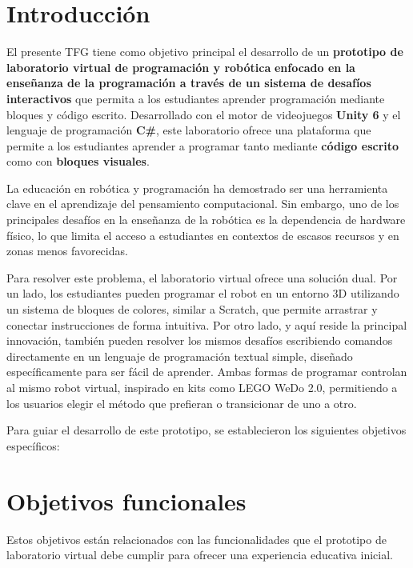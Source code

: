 
\section{Introducción}

El presente TFG tiene como objetivo principal el desarrollo de un \textbf{prototipo de laboratorio virtual de programación y robótica}  \textbf{enfocado en la enseñanza de la programación a través de un sistema de desafíos interactivos}  que permita a los estudiantes aprender programación mediante bloques y código escrito. Desarrollado con el motor de videojuegos \textbf{Unity 6} y el lenguaje de programación \textbf{C\#}, este laboratorio ofrece una plataforma  que permite a los estudiantes aprender a programar tanto mediante \textbf{código escrito} como con \textbf{bloques visuales}.

La educación en robótica y programación ha demostrado ser una herramienta clave en el aprendizaje del pensamiento computacional. Sin embargo, uno de los principales desafíos en la enseñanza de la robótica es la dependencia de hardware físico, lo que limita el acceso a estudiantes en contextos de escasos recursos y en zonas menos favorecidas.

Para resolver este problema, el laboratorio virtual ofrece una solución dual. Por un lado, los estudiantes pueden programar el robot en un entorno 3D utilizando un sistema de bloques de colores, similar a Scratch, que permite arrastrar y conectar instrucciones de forma intuitiva. Por otro lado, y aquí reside la principal innovación, también pueden resolver los mismos desafíos escribiendo comandos directamente en un lenguaje de programación textual simple, diseñado específicamente para ser fácil de aprender. Ambas formas de programar controlan al mismo robot virtual, inspirado en kits como LEGO WeDo 2.0, permitiendo a los usuarios elegir el método que prefieran o transicionar de uno a otro.

Para guiar el desarrollo de este prototipo, se establecieron los siguientes objetivos específicos:

\section{Objetivos funcionales}

Estos objetivos están relacionados con las funcionalidades que el prototipo de laboratorio virtual debe cumplir para ofrecer una experiencia educativa inicial.

